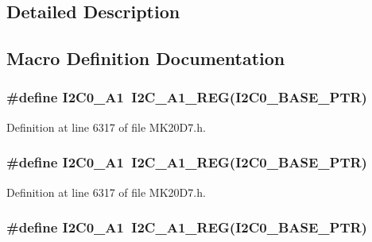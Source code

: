\subsection{Detailed Description}


\subsection{Macro Definition Documentation}
\subsubsection[{\texorpdfstring{I2\+C0\+\_\+\+A1}{I2C0_A1}}]{\setlength{\rightskip}{0pt plus 5cm}\#define I2\+C0\+\_\+\+A1~{\bf I2\+C\+\_\+\+A1\+\_\+\+R\+EG}({\bf I2\+C0\+\_\+\+B\+A\+S\+E\+\_\+\+P\+TR})}\hypertarget{group___i2_c___register___accessor___macros_gaab25b2cfc0f440c11ba84defee435e0e}{}\label{group___i2_c___register___accessor___macros_gaab25b2cfc0f440c11ba84defee435e0e}


Definition at line 6317 of file M\+K20\+D7.\+h.

\subsubsection[{\texorpdfstring{I2\+C0\+\_\+\+A1}{I2C0_A1}}]{\setlength{\rightskip}{0pt plus 5cm}\#define I2\+C0\+\_\+\+A1~{\bf I2\+C\+\_\+\+A1\+\_\+\+R\+EG}({\bf I2\+C0\+\_\+\+B\+A\+S\+E\+\_\+\+P\+TR})}\hypertarget{group___i2_c___register___accessor___macros_gaab25b2cfc0f440c11ba84defee435e0e}{}\label{group___i2_c___register___accessor___macros_gaab25b2cfc0f440c11ba84defee435e0e}


Definition at line 6317 of file M\+K20\+D7.\+h.

\subsubsection[{\texorpdfstring{I2\+C0\+\_\+\+A1}{I2C0_A1}}]{\setlength{\rightskip}{0pt plus 5cm}\#define I2\+C0\+\_\+\+A1~{\bf I2\+C\+\_\+\+A1\+\_\+\+R\+EG}({\bf I2\+C0\+\_\+\+B\+A\+S\+E\+\_\+\+P\+TR})}\hypertarget{group___i2_c___register___accessor___macros_gaab25b2cfc0f440c11ba84defee435e0e}{}\label{group___i2_c___register___accessor___macros_gaab25b2cfc0f440c11ba84defee435e0e}


